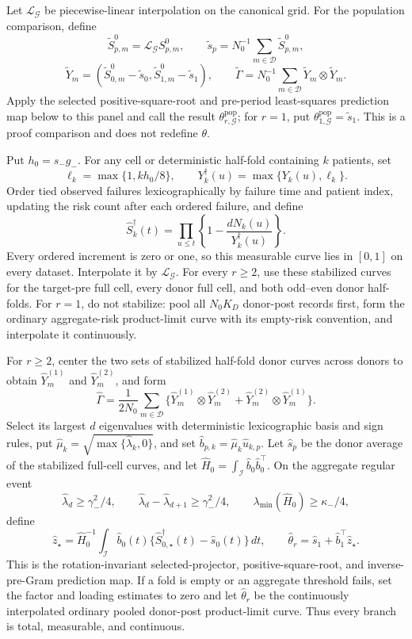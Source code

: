 Let \(\mathcal L_{\mathcal G}\) be piecewise-linear interpolation on the canonical grid. For the population comparison, define
\[
 \widetilde S^0_{p,m}=\mathcal L_{\mathcal G}S^0_{p,m},\qquad
 \widetilde s_p=N_0^{-1}\sum_{m\in\mathcal D}\widetilde S^0_{p,m},
\]
\[
 \widetilde Y_m=(\widetilde S^0_{0,m}-\widetilde s_0,
                  \widetilde S^0_{1,m}-\widetilde s_1),\qquad
 \widetilde\Gamma=N_0^{-1}\sum_{m\in\mathcal D}
 \widetilde Y_m\otimes\widetilde Y_m.
\]
Apply the selected positive-square-root and pre-period least-squares prediction map below to this panel and call the result \(\theta^{\mathrm{pop}}_{r,\mathcal G}\); for \(r=1\), put \(\theta^{\mathrm{pop}}_{1,\mathcal G}=\widetilde s_1\). This is a proof comparison and does not redefine \(\theta\).

Put \(h_0=s_-g_-\). For any cell or deterministic half-fold containing \(k\) patients, set
\[
 \ell_k=\max\{1,kh_0/8\},\qquad
 Y_k^\dagger(u)=\max\{Y_k(u),\ell_k\}.
\]
Order tied observed failures lexicographically by failure time and patient index, updating the risk count after each ordered failure, and define
\[
 \widehat S_k^\dagger(t)=
 \prod_{u\le t}\left\{1-\frac{dN_k(u)}{Y_k^\dagger(u)}\right\}.
\]
Every ordered increment is zero or one, so this measurable curve lies in \([0,1]\) on every dataset. Interpolate it by \(\mathcal L_{\mathcal G}\). For every \(r\ge2\), use these stabilized curves for the target-pre full cell, every donor full cell, and both odd--even donor half-folds. For \(r=1\), do not stabilize: pool all \(N_0K_D\) donor-post records first, form the ordinary aggregate-risk product-limit curve with its empty-risk convention, and interpolate it continuously.

For \(r\ge2\), center the two sets of stabilized half-fold donor curves across donors to obtain \(\widehat Y_m^{(1)}\) and \(\widehat Y_m^{(2)}\), and form
\[
 \widehat\Gamma=\frac{1}{2N_0}\sum_{m\in\mathcal D}
 \{\widehat Y_m^{(1)}\otimes\widehat Y_m^{(2)}+
   \widehat Y_m^{(2)}\otimes\widehat Y_m^{(1)}\}.
\]
Select its largest \(d\) eigenvalues with deterministic lexicographic basis and sign rules, put \(\widehat\mu_k=\sqrt{\max\{\widehat\lambda_k,0\}}\), and set \(\widehat b_{p,k}=\widehat\mu_k\widehat u_{k,p}\). Let \(\widehat s_p\) be the donor average of the stabilized full-cell curves, and let \(\widehat H_0=\int_{\mathcal I}\widehat b_0\widehat b_0^\top\). On the aggregate regular event
\[
 \widehat\lambda_d\ge\gamma_-^2/4,\qquad
 \widehat\lambda_d-\widehat\lambda_{d+1}\ge\gamma_-^2/4,
 \qquad \lambda_{\min}(\widehat H_0)\ge\kappa_-/4,
\]
define
\[
 \widehat z_\star=\widehat H_0^{-1}\int_{\mathcal I}\widehat b_0(t)
 \{\widehat S_{0,\star}^\dagger(t)-\widehat s_0(t)\}\,dt,
 \qquad
 \widehat\theta_r=\widehat s_1+\widehat b_1^\top\widehat z_\star.
\]
This is the rotation-invariant selected-projector, positive-square-root, and inverse-pre-Gram prediction map. If a fold is empty or an aggregate threshold fails, set the factor and loading estimates to zero and let \(\widehat\theta_r\) be the continuously interpolated ordinary pooled donor-post product-limit curve. Thus every branch is total, measurable, and continuous.

